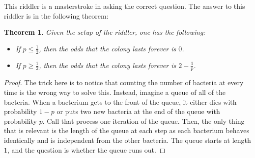 \documentclass[11pt]{article}
\newtheorem{theorem}{Theorem}
\theoremstyle{definition}
\newcommand{\Z}{\mathbb{Z}}
\begin{document}
This riddler is a masterstroke in asking the correct question.  The answer to this riddler is in the following theorem:
\begin{theorem}
Given the setup of the riddler, one has the following:
\begin{itemize}
\item If $p \leq \frac{1}{2}$, then the odds that the colony lasts forever is $0$.
\item If $p \geq \frac{1}{2}$, then the odds that the colony lasts forever is $2 - \frac{1}{p}$.
\end{itemize}
\end{theorem}
\begin{proof}
The trick here is to notice that counting the number of bacteria at every time is the wrong way to solve this.  Instead, imagine a queue of all of the bacteria.  When a bacterium gets to the front of the queue, it either dies with probability $1-p$ or puts two new bacteria at the end of the queue with probability $p$.  Call that process one iteration of the queue.  Then, the only thing that is relevant is the length of the queue at each step as each bacterium behaves identically and is independent from the other bacteria.  The queue starts at length $1$, and the question is whether the queue runs out.

%


\end{proof}
\end{document}
